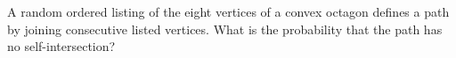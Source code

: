 A random ordered listing of the eight vertices of a convex octagon defines a path by joining consecutive listed vertices. What is the probability that the path has no self-intersection?
